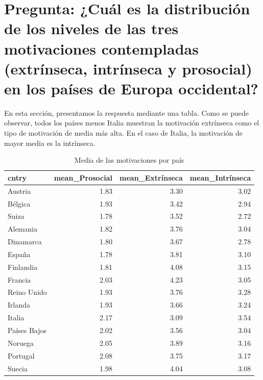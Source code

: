 \documentclass{article}
\begin{document}
\section {Pregunta: ¿Cuál es la distribución de los niveles de las tres motivaciones contempladas (extrínseca, intrínseca y prosocial) en los países de Europa occidental?}

En esta sección, presentamos la respuesta mediante una tabla.
Como se puede observar, todos los países menos Italia muestran la motivación extrínseca como el tipo de motivación de media más alta. En el caso de Italia, la motivación de mayor media es la intrínseca.

\begin{center}
\begin{table}[H]
\centering
\caption{Media de las motivaciones por país}
\begin{tabular}[t]{lrrr}
\toprule
cntry & mean\_Prosocial & mean\_Extrínseca & mean\_Intrínseca\\
\midrule
Austria & 1.83 & 3.30 & 3.02\\
Bélgica & 1.93 & 3.42 & 2.94\\
Suiza & 1.78 & 3.52 & 2.72\\
Alemania & 1.82 & 3.76 & 3.04\\
Dinamarca & 1.80 & 3.67 & 2.78\\
\addlinespace
España & 1.78 & 3.81 & 3.10\\
Finlandia & 1.81 & 4.08 & 3.15\\
Francia & 2.03 & 4.23 & 3.05\\
Reino Unido & 1.93 & 3.76 & 3.28\\
Irlanda & 1.93 & 3.66 & 3.24\\
\addlinespace
Italia & 2.17 & 3.09 & 3.54\\
Países Bajos & 2.02 & 3.56 & 3.04\\
Noruega & 2.05 & 3.89 & 3.16\\
Portugal & 2.08 & 3.75 & 3.17\\
Suecia & 1.98 & 4.04 & 3.08\\
\bottomrule
\end{tabular}
\end{table}
\end{center}
\end{document}
